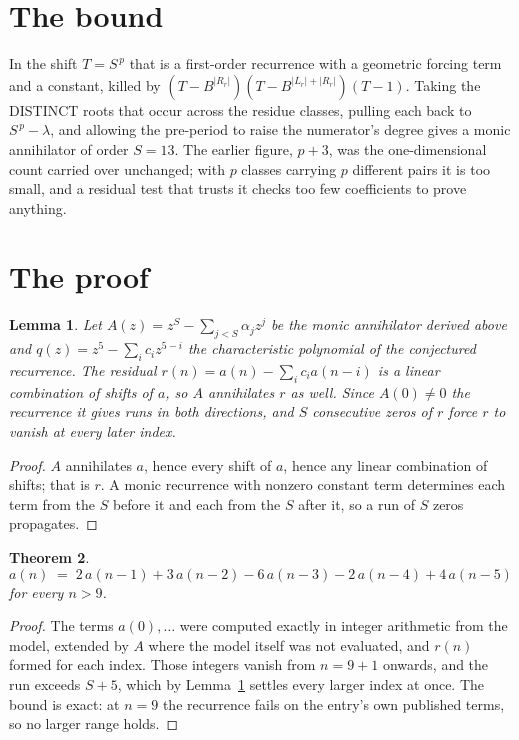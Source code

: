 \documentclass[11pt,a4paper]{article}
\theoremstyle{plain}
\newtheorem{theorem}{Theorem}
\newtheorem{lemma}[theorem]{Lemma}
\theoremstyle{definition}
\begin{document}
\section{The bound}

In the shift $T=S^{\,p}$ that is a first-order recurrence with a geometric forcing term and a
constant, killed by $(T-B^{|R_r|})(T-B^{|L_r|+|R_r|})(T-1)$. Taking the DISTINCT roots that
occur across the residue classes, pulling each back to $S^{\,p}-\lambda$, and allowing the
pre-period to raise the numerator's degree gives a monic annihilator of order $S=13$. The
earlier figure, $p+3$, was the one-dimensional count carried over unchanged; with $p$ classes
carrying $p$ different pairs it is too small, and a residual test that trusts it checks too few
coefficients to prove anything.

\section{The proof}

\begin{lemma}\label{lem:crit}
Let $A(z)=z^S-\sum_{j<S}\alpha_jz^{j}$ be the monic annihilator derived above and
$q(z)=z^{5}-\sum_ic_iz^{5-i}$ the characteristic polynomial of the conjectured
recurrence. The residual $r(n)=a(n)-\sum_ic_ia(n-i)$ is a linear combination of shifts of $a$,
so $A$ annihilates $r$ as well. Since $A(0)\ne0$ the recurrence it gives runs in both
directions, and $S$ consecutive zeros of $r$ force $r$ to vanish at every later index.
\end{lemma}

\begin{proof}
$A$ annihilates $a$, hence every shift of $a$, hence any linear combination of shifts; that is
$r$. A monic recurrence with nonzero constant term determines each term from the $S$ before it
and each from the $S$ after it, so a run of $S$ zeros propagates.
\end{proof}

\begin{theorem}
\[
a(n)\;=\;2\,a(n-1) + 3\,a(n-2) - 6\,a(n-3) - 2\,a(n-4) + 4\,a(n-5)
\]
for every $n>9$.
\end{theorem}

\begin{proof}
The terms $a(0),\dots$ were computed exactly in integer arithmetic from the model, extended by
$A$ where the model itself was not evaluated, and $r(n)$ formed for each index. Those integers
vanish from $n=9+1$ onwards, and the run exceeds $S+5$, which by
Lemma~\ref{lem:crit} settles every larger index at once. The bound is exact: at $n=9$ the recurrence fails on the entry's own published terms, so no larger range holds.
\end{proof}
\end{document}
